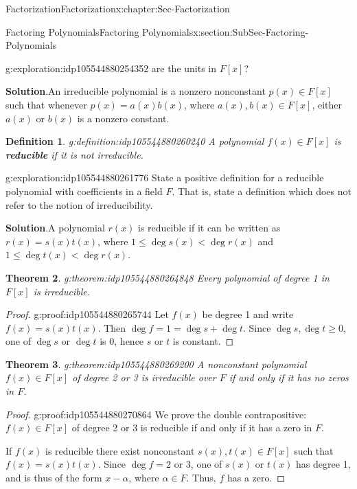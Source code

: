\documentclass[oneside,10pt,]{book}
\newcommand{\blocktitlefont}{\relax}
\newcommand{\terminology}[1]{\textbf{#1}}
\numberwithin{equation}{section}
\renewcommand{\le}{\leqslant}
\renewcommand{\ge}{\geqslant}
\newtheorem{theorem}{Theorem}[section]
\newtheorem{definition}[theorem]{Definition}
\newcommand{\lt}{<}
\begin{document}
\begin{chapterptx}{Factorization}{}{Factorization}{}{}{x:chapter:Sec-Factorization}
\begin{sectionptx}{Factoring Polynomials}{}{Factoring Polynomials}{}{}{x:section:SubSec-Factoring-Polynomials}
\begin{exploration}{}{g:exploration:idp105544880254352}
\noindentWhat are the units in \(F[x]\)?%
\par\smallskip%
\noindent\textbf{\blocktitlefont Solution}.\hypertarget{g:solution:idp105544880257936}{}\quad{}An irreducible polynomial is a nonzero nonconstant \(p(x)\in F[x]\) such that whenever \(p(x) = a(x) b(x)\), where \(a(x), b(x) \in F[x]\), either \(a(x)\) or \(b(x)\) is a nonzero constant.%
\end{exploration}%
\begin{definition}{}{g:definition:idp105544880260240}%
%
A polynomial \(f(x)\in F[x]\) is \terminology{reducible} if it is not irreducible.%
\end{definition}
\begin{exploration}{}{g:exploration:idp105544880261776}%
State a positive definition for a reducible polynomial with coefficients in a field \(F\). That is, state a definition which does not refer to the notion of irreducibility.%
\par\smallskip%
\noindent\textbf{\blocktitlefont Solution}.\hypertarget{g:solution:idp105544880262928}{}\quad{}A polynomial \(r(x)\) is reducible if it can be written as \(r(x) = s(x) t(x)\), where \(1 \le \deg s(x) \lt \deg r(x)\) and \(1 \le \deg t(x) \lt \deg r(x)\).%
\end{exploration}%
\begin{theorem}{}{}{g:theorem:idp105544880264848}%
Every polynomial of degree 1 in \(F[x]\) is irreducible.%
\end{theorem}
\begin{proof}{}{g:proof:idp105544880265744}
Let \(f(x)\) be degree 1 and write \(f(x) = s(x) t(x)\). Then \(\deg f = 1 = \deg s + \deg t\). Since \(\deg s, \deg t \ge 0\), one of \(\deg s\) or \(\deg t\) is 0, hence \(s\) or \(t\) is constant.%
\end{proof}
\begin{theorem}{}{}{g:theorem:idp105544880269200}%
A nonconstant polynomial \(f(x)\in F[x]\) of degree 2 or 3 is irreducible over \(F\) if and only if it has no zeros in \(F\).%
\end{theorem}
\begin{proof}{}{g:proof:idp105544880270864}
We prove the double contrapositive: \(f(x)\in F[x]\) of degree 2 or 3 is reducible if and only if it has a zero in \(F\).%
\par
If \(f(x)\) is reducible there exist nonconstant \(s(x),t(x)\in F[x]\) such that \(f(x) = s(x) t(x)\). Since \(\deg f = 2\) or 3, one of \(s(x)\) or \(t(x)\) has degree 1, and is thus of the form \(x-\alpha\), where \(\alpha \in F\). Thus, \(f\) has a zero.%

\end{proof}
\end{sectionptx}
\end{chapterptx}
\end{document}
